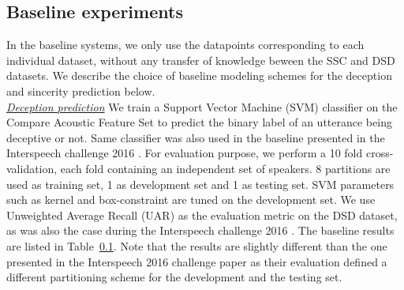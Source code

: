 \documentclass{article}
\begin{document}
\subsection{Baseline experiments}

In the baseline systems, we only use the datapoints corresponding to each individual dataset, without any transfer of knowledge beween the SSC and DSD datasets.
We describe the choice of baseline modeling schemes for the deception and sincerity prediction below.
\\

\noindent\underline{\it Deception prediction}  
We train a Support Vector Machine (SVM) classifier on the Compare Acoustic Feature Set \cite{} to predict the binary label of an utterance being deceptive or not.
Same classifier was also used in the baseline presented in the Interspeech challenge 2016 \cite{}.
For evaluation purpose, we perform a 10 fold cross-validation, each fold containing an independent set of speakers.  
8 partitions are used as training set, 1 as development set and 1 as testing set.
SVM parameters such as kernel and box-constraint are tuned on the development set.
We use Unweighted Average Recall (UAR) as the evaluation metric on the DSD dataset, as was also the case during the Interspeech challenge 2016 \cite{}. 
The baseline results are listed in Table~\ref{}.
Note that the results are slightly different than the one presented in the Interspeech 2016 challenge paper \cite{} as their evaluation defined a different partitioning scheme for the development and the testing set.
\\
\end{document}
